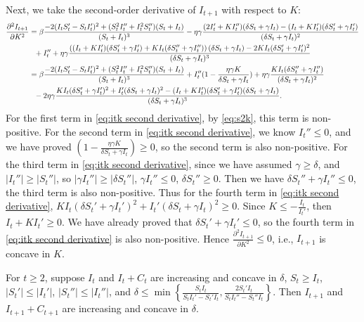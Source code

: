 \documentclass[nonblindrev, copyedit]{informs3a}
\newcounter{prop}[chapter]
\begin{document}
Next, we take the second-order derivative of $I_{t+1}$ with respect to $K$:
\begin{align}
    \frac{\partial^2 I_{t+1}}{\partial K^2}&=\beta\frac{-2(I_{t}S_{t}'-S_{t}I_{t}')^2+(S_{t}^2I_{t}''+I_{t}^2S_{t}'')(S_{t}+I_{t})}{(S_{t}+I_{t})^3}-\eta\gamma\frac{(2I_{t}'+KI_{t}'')(\delta S_{t}+\gamma I_{t})-(I_{t}+KI_{t}')(\delta S_{t}'+\gamma I_{t}')}{(\delta S_{t}+\gamma I_{t})^2}\notag\\
    &\ \ +I_{t}''+\eta\gamma\frac{\left((I_{t}+KI_{t}')(\delta S_{t}'+\gamma I_{t}')+KI_{t}(\delta S_{t}''+\gamma I_{t}'')\right)(\delta S_{t}+\gamma I_{t})-2KI_{t}(\delta S_{t}'+\gamma I_{t}')^2}{(\delta S_{t}+\gamma I_{t})^3}\notag\\
    &=\beta\frac{-2(I_{t}S_{t}'-S_{t}I_{t}')^2+(S_{t}^2I_{t}''+I_{t}^2S_{t}'')(S_{t}+I_{t})}{(S_{t}+I_{t})^3}+I_{t}''(1-\frac{\eta\gamma K}{\delta S_{t}+\gamma I_{t}})+\eta\gamma\frac{KI_{t}(\delta S_{t}''+\gamma I_{t}'')}{(\delta S_{t}+\gamma I_{t})^2}\notag\\
    &\ \ -2\eta\gamma\frac{KI_{t}(\delta S_{t}'+\gamma I_{t}')^2+I_{t}'(\delta S_{t}+\gamma I_{t})^2-(I_{t}+KI_{t}')(\delta S_{t}'+\gamma I_{t}')(\delta S_{t}+\gamma I_{t})}{(\delta S_{t}+\gamma I_{t})^3}.\label{eq:itk second derivative}
\end{align}
For the first term in \eqref{eq:itk second derivative}, by \eqref{eq:s2k}, this term is non-positive.
For the second term in \eqref{eq:itk second derivative}, we know $I_t''\le0$, and we have proved $(1-\frac{\eta\gamma K}{\delta S_{t}+\gamma I_{t}})\ge0$, so the second term is also non-positive. For the third term in \eqref{eq:itk second derivative}, since we have assumed $\gamma\ge\delta$, and $|I_{t}''|\ge|S_{t}''|$, so $|\gamma I_{t}''|\ge|\delta S_{t}''|$, $\gamma I_{t}''\le0$, $\delta S_{t}''\ge0$. Then we have $\delta S_{t}''+\gamma I_{t}''\le0$, the third term is also non-positive. Thus for the fourth term in \eqref{eq:itk second derivative}, $KI_{t}(\delta S_{t}'+\gamma I_{t}')^2+I_{t}'(\delta S_{t}+\gamma I_{t})^2\ge0$. Since $K\le-\frac{I_{t}}{I_{t}'}$, then $I_{t}+KI_{t}'\ge0$.
We have already proved that $\delta S_{t}'+\gamma I_{t}'\le0$, so the fourth term in \eqref{eq:itk second derivative} is also non-positive. Hence $\frac{\partial^2 I_{t+1}}{\partial K^2}\le0$, i.e., $I_{t+1}$ is concave in $K$.\Halmos
\endproof

\begin{proposition}
\label{Extensions with delta}
For $t\ge2$, suppose $I_{t}$ and $I_{t}+C_{t}$ are increasing and concave in $\delta$, $S_{t}\ge I_{t}$, $|S_{t}'|\le |I_{t}'|$, $|S_{t}''|\le |I_{t}''|$,
and $\delta\le\min\left\{\frac{S_{t}I_{t}}{S_{t}I_{t}'-S_{t}'I_{t}},\frac{2S_{t}'I_{t}}{S_{t}I_{t}''-S_{t}''I_{t}}\right\}$.
Then $I_{t+1}$ and $I_{t+1}+C_{t+1}$ are increasing and concave in $\delta$.
\end{proposition}
\end{document}
